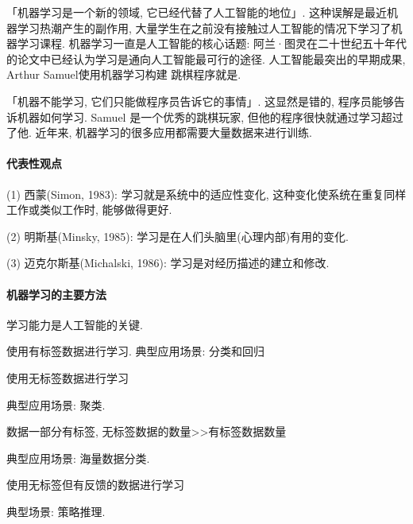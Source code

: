「机器学习是一个新的领域, 它已经代替了人工智能的地位」. 这种误解是最近机器学习热潮产生的副作用, 大量学生在之前没有接触过人工智能的情况下学习了机器学习课程. 机器学习一直是人工智能的核心话题: 阿兰·图灵在二十世纪五十年代的论文中已经认为学习是通向人工智能最可行的途径. 人工智能最突出的早期成果, Arthur Samuel使用机器学习构建 跳棋程序就是.

「机器不能学习, 它们只能做程序员告诉它的事情」. 这显然是错的, 程序员能够告诉机器如何学习. Samuel 是一个优秀的跳棋玩家, 但他的程序很快就通过学习超过了他. 近年来, 机器学习的很多应用都需要大量数据来进行训练.
\paragraph{代表性观点}

(1) 西蒙(Simon, 1983): 学习就是系统中的适应性变化, 这种变化使系统在重复同样工作或类似工作时, 能够做得更好.

(2) 明斯基(Minsky, 1985): 学习是在人们头脑里(心理内部)有用的变化.

(3) 迈克尔斯基(Michalski, 1986): 学习是对经历描述的建立和修改.

\paragraph{机器学习的主要方法}
学习能力是人工智能的关键.
\begin{tcolorbox}[colback=white!50,colframe=orange!50,title=监督学习( Supervised learning)]
    使用有标签数据进行学习. 典型应用场景: 分类和回归
\end{tcolorbox}

\begin{tcolorbox}[colback=white!50,colframe=orange!50,title=非监督学习( Unsupervised learning)]
使用无标签数据进行学习

典型应用场景: 聚类.
\end{tcolorbox}

\begin{tcolorbox}[colback=white!50,colframe=orange!50,title=半监督学习( Semi-supervised learning)]
数据一部分有标签, 无标签数据的数量>>有标签数据数量

典型应用场景: 海量数据分类.
\end{tcolorbox}

\begin{tcolorbox}[colback=white!50,colframe=orange!50,title=强化学习( Reinforcement learning)]
使用无标签但有反馈的数据进行学习

典型场景: 策略推理.
\end{tcolorbox}

